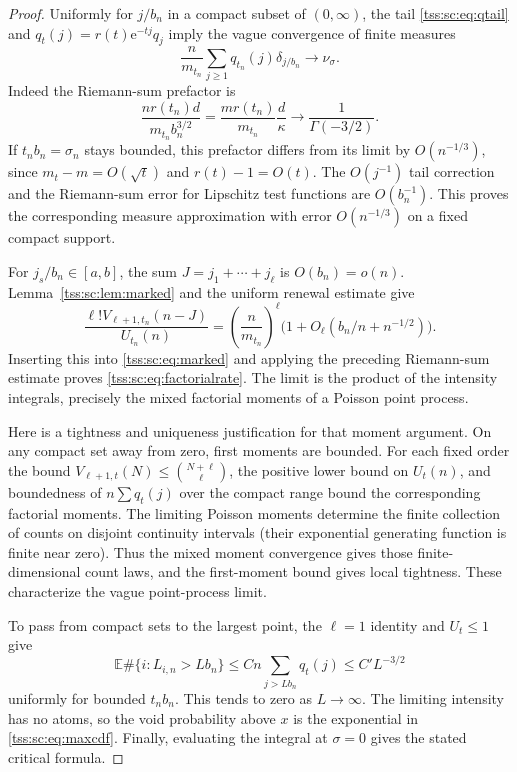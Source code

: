 \documentclass[11pt]{article}
\theoremstyle{remark}\newtheorem{remark}[theorem]{Remark}
\theoremstyle{definition}\newtheorem{definition}[theorem]{Definition}
\newcommand{\e}{\mathrm e}
\newcommand{\E}{\mathbb E}
\begin{document}
\begin{proof}
Uniformly for $j/b_n$ in a compact subset of $(0,\infty)$, the tail \eqref{tss:sc:eq:qtail} and $q_t(j)=r(t)\e^{-tj}q_j$ imply the vague convergence of finite measures
\begin{equation}\label{tss:sc:eq:intensitymeasure}
 \frac n{m_{t_n}}\sum_{j\geq1}q_{t_n}(j)\delta_{j/b_n}
 \longrightarrow\nu_\sigma.
\end{equation}
Indeed the Riemann-sum prefactor is
\[
 \frac{n r(t_n)d}{m_{t_n}b_n^{3/2}}
 =\frac{m r(t_n)}{m_{t_n}}\frac d\kappa
 \longrightarrow\frac1{\Gamma(-3/2)}.
\]
If $t_nb_n=\sigma_n$ stays bounded, this prefactor differs from its limit by $O(n^{-1/3})$, since $m_t-m=O(\sqrt t)$ and $r(t)-1=O(t)$. The $O(j^{-1})$ tail correction and the Riemann-sum error for Lipschitz test functions are $O(b_n^{-1})$. This proves the corresponding measure approximation with error $O(n^{-1/3})$ on a fixed compact support.

For $j_s/b_n\in[a,b]$, the sum $J=j_1+\cdots+j_\ell$ is $O(b_n)=o(n)$. Lemma~\ref{tss:sc:lem:marked} and the uniform renewal estimate give
\[
 \frac{\ell!V_{\ell+1,t_n}(n-J)}{U_{t_n}(n)}
 =\left(\frac n{m_{t_n}}\right)^\ell
     \bigl(1+O_\ell(b_n/n+n^{-1/2})\bigr).
\]
Inserting this into \eqref{tss:sc:eq:marked} and applying the preceding Riemann-sum estimate proves \eqref{tss:sc:eq:factorialrate}. The limit is the product of the intensity integrals, precisely the mixed factorial moments of a Poisson point process.

Here is a tightness and uniqueness justification for that moment argument. On any compact set away from zero, first moments are bounded. For each fixed order the bound
$V_{\ell+1,t}(N)\leq\binom{N+\ell}{\ell}$, the positive lower bound on $U_t(n)$, and boundedness of $n\sum q_t(j)$ over the compact range bound the corresponding factorial moments. The limiting Poisson moments determine the finite collection of counts on disjoint continuity intervals (their exponential generating function is finite near zero). Thus the mixed moment convergence gives those finite-dimensional count laws, and the first-moment bound gives local tightness. These characterize the vague point-process limit.

To pass from compact sets to the largest point, the $\ell=1$ identity and $U_t\leq1$ give
\begin{equation}\label{tss:sc:eq:tailtight}
 \E\#\{i:L_{i,n}>Lb_n\}
 \leq Cn\sum_{j>Lb_n}q_t(j)
 \leq C'L^{-3/2}
\end{equation}
uniformly for bounded $t_nb_n$. This tends to zero as $L\to\infty$. The limiting intensity has no atoms, so the void probability above $x$ is the exponential in \eqref{tss:sc:eq:maxcdf}. Finally, evaluating the integral at $\sigma=0$ gives the stated critical formula.
\end{proof}
\end{document}

